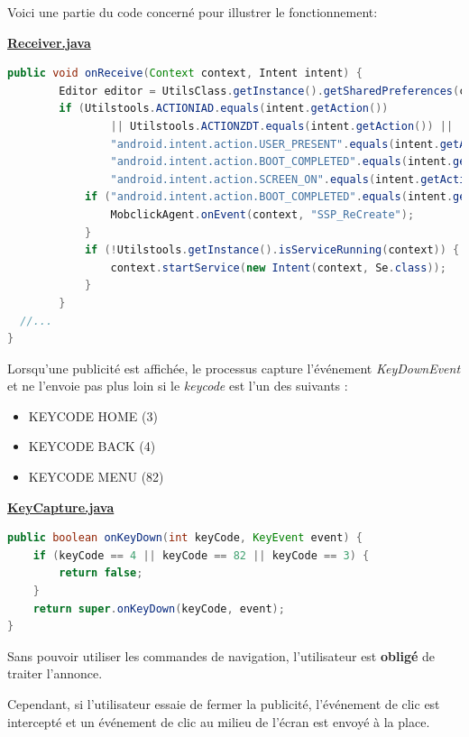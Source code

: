 \documentclass[
  french,
  paper=a4,
  ,captions=tableheading
]{scrartcl}
\begin{document}
Voici une partie du code concerné pour illustrer le fonctionnement:

\href{https://gist.github.com/deniskrr/7e1bcccde27ba81d17f074729aba5fb4\#file-receiver-java}{\textbf{Receiver.java}}

\begin{lstlisting}[language=Java]
public void onReceive(Context context, Intent intent) {
        Editor editor = UtilsClass.getInstance().getSharedPreferences(context).edit();
        if (Utilstools.ACTIONIAD.equals(intent.getAction())
                || Utilstools.ACTIONZDT.equals(intent.getAction()) ||
                "android.intent.action.USER_PRESENT".equals(intent.getAction()) ||
                "android.intent.action.BOOT_COMPLETED".equals(intent.getAction()) ||
                "android.intent.action.SCREEN_ON".equals(intent.getAction())) {
            if ("android.intent.action.BOOT_COMPLETED".equals(intent.getAction())) {
                MobclickAgent.onEvent(context, "SSP_ReCreate");
            }
            if (!Utilstools.getInstance().isServiceRunning(context)) {
                context.startService(new Intent(context, Se.class));
            }
        }
  //...
}
\end{lstlisting}

Lorsqu'une publicité est affichée, le processus capture l'événement
\emph{KeyDownEvent} et ne l'envoie pas plus loin si le \emph{keycode}
est l'un des suivants :

\begin{itemize}
\item
  KEYCODE HOME (3)
\item
  KEYCODE BACK (4)
\item
  KEYCODE MENU (82)
\end{itemize}

\href{https://gist.github.com/deniskrr/76499ac07a0190a6f515944ae641d13f\#file-keycapture-java}{\textbf{KeyCapture.java}}

\begin{lstlisting}[language=Java]
public boolean onKeyDown(int keyCode, KeyEvent event) {
    if (keyCode == 4 || keyCode == 82 || keyCode == 3) {
        return false;
    }
    return super.onKeyDown(keyCode, event);
}
\end{lstlisting}

Sans pouvoir utiliser les commandes de navigation, l'utilisateur est
\textbf{obligé} de traiter l'annonce.

Cependant, si l'utilisateur essaie de fermer la publicité, l'événement
de clic est intercepté et un événement de clic au milieu de l'écran est
envoyé à la place.
\end{document}

